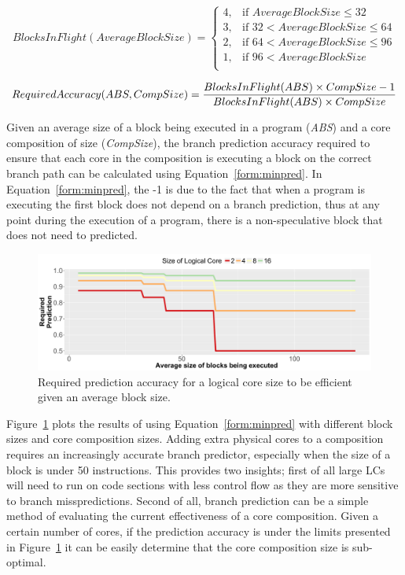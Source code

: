 \begin{equation}\label{form:blocks}
BlocksInFlight(AverageBlockSize) = \begin{cases}
4, &\text{if } AverageBlockSize \le 32 \\
3, &\text{if } 32 < AverageBlockSize \le 64 \\
2, &\text{if } 64 < AverageBlockSize \le 96\\
1, &\text{if } 96 < AverageBlockSize\\
\end{cases}
\end{equation}

\begin{equation}\label{form:minpred}
RequiredAccuracy(ABS,CompSize)= \frac{BlocksInFlight(ABS) \times CompSize- 1}{BlocksInFlight(ABS) \times CompSize}
\vspace{1em}
\end{equation}


Given an average size of a block being executed in a program (\textit{ABS}) and a core composition of size (\textit{CompSize}), the branch prediction accuracy required to ensure that each core in the composition is executing a block on the correct branch path can be calculated using Equation~\ref{form:minpred}.
In Equation~\ref{form:minpred}, the -1 is due to the fact that when a program is executing the first block does not depend on a branch prediction, thus at any point during the execution of a program, there is a non-speculative block that does not need to predicted.

\begin{figure}[t]
    \centering
    \includegraphics[width=\textwidth]{cases-paper/graphics/limit_study/prediction_req.pdf}
    \caption{Required prediction accuracy for a logical core size to be efficient given an average block size.}
    \label{fig:req_pred}
	\vspace{1em}
\end{figure}
Figure~\ref{fig:req_pred} plots the results of using Equation~\ref{form:minpred} with different block sizes and core composition sizes.
Adding extra physical cores to a composition requires an increasingly accurate branch predictor, especially when the size of a block is under 50 instructions.
This provides two insights; first of all large LCs will need to run on code sections with less control flow as they are more sensitive to branch misspredictions.
Second of all, branch prediction can be a simple method of evaluating the current effectiveness of a core composition.
Given a certain number of cores, if the prediction accuracy is under the limits presented in Figure~\ref{fig:req_pred} it can be easily determine that the core composition size is sub-optimal.

